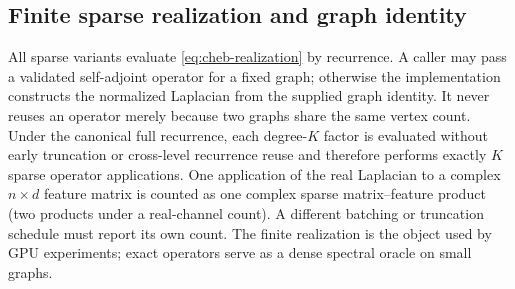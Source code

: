 \subsection{Finite sparse realization and graph identity}
\label{sec:method-cheb}

All sparse variants evaluate \cref{eq:cheb-realization} by recurrence.  A
caller may pass a validated self-adjoint operator for a fixed graph; otherwise
the implementation constructs the normalized Laplacian from the supplied
graph identity.  It never reuses an operator merely because two graphs share
the same vertex count.  Under the canonical full recurrence, each degree-$K$
factor is evaluated without early truncation or cross-level recurrence reuse
and therefore performs exactly $K$ sparse operator applications.  One
application of the real Laplacian to a complex $n\times d$ feature matrix is
counted as one complex sparse matrix--feature product (two products under a
real-channel count).  A different batching or truncation schedule must report
its own count.  The finite realization is the object used by GPU experiments;
exact operators serve as a dense spectral oracle on small graphs.
